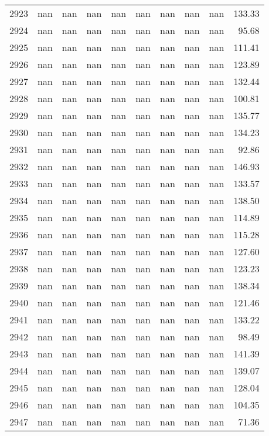 \begin{tabular}{lrrrrrrrrr}
2923 & nan & nan & nan & nan & nan & nan & nan & nan & 133.33 \\
2924 & nan & nan & nan & nan & nan & nan & nan & nan & 95.68 \\
2925 & nan & nan & nan & nan & nan & nan & nan & nan & 111.41 \\
2926 & nan & nan & nan & nan & nan & nan & nan & nan & 123.89 \\
2927 & nan & nan & nan & nan & nan & nan & nan & nan & 132.44 \\
2928 & nan & nan & nan & nan & nan & nan & nan & nan & 100.81 \\
2929 & nan & nan & nan & nan & nan & nan & nan & nan & 135.77 \\
2930 & nan & nan & nan & nan & nan & nan & nan & nan & 134.23 \\
2931 & nan & nan & nan & nan & nan & nan & nan & nan & 92.86 \\
2932 & nan & nan & nan & nan & nan & nan & nan & nan & 146.93 \\
2933 & nan & nan & nan & nan & nan & nan & nan & nan & 133.57 \\
2934 & nan & nan & nan & nan & nan & nan & nan & nan & 138.50 \\
2935 & nan & nan & nan & nan & nan & nan & nan & nan & 114.89 \\
2936 & nan & nan & nan & nan & nan & nan & nan & nan & 115.28 \\
2937 & nan & nan & nan & nan & nan & nan & nan & nan & 127.60 \\
2938 & nan & nan & nan & nan & nan & nan & nan & nan & 123.23 \\
2939 & nan & nan & nan & nan & nan & nan & nan & nan & 138.34 \\
2940 & nan & nan & nan & nan & nan & nan & nan & nan & 121.46 \\
2941 & nan & nan & nan & nan & nan & nan & nan & nan & 133.22 \\
2942 & nan & nan & nan & nan & nan & nan & nan & nan & 98.49 \\
2943 & nan & nan & nan & nan & nan & nan & nan & nan & 141.39 \\
2944 & nan & nan & nan & nan & nan & nan & nan & nan & 139.07 \\
2945 & nan & nan & nan & nan & nan & nan & nan & nan & 128.04 \\
2946 & nan & nan & nan & nan & nan & nan & nan & nan & 104.35 \\
2947 & nan & nan & nan & nan & nan & nan & nan & nan & 71.36 \\

\end{tabular}
